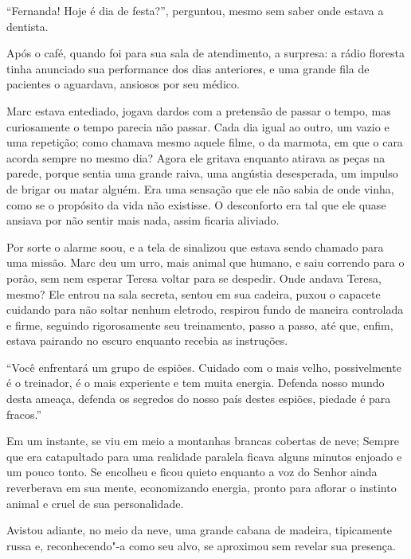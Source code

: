 ``Fernanda! Hoje é dia de festa?'', perguntou, mesmo sem saber onde
estava a dentista.

Após o café, quando foi para sua sala de atendimento, a surpresa: a
rádio floresta tinha anunciado sua performance dos dias anteriores, e uma
grande fila de pacientes o aguardava, ansiosos por seu médico.

\asterisc


Marc estava entediado, jogava dardos com a pretensão de passar o tempo,
mas curiosamente o tempo parecia não passar. Cada dia igual ao outro, um
vazio e uma repetição; como chamava mesmo aquele filme, o da marmota, em
que o cara acorda sempre no mesmo dia? Agora ele gritava enquanto
atirava as peças na parede, porque sentia uma grande raiva, uma angústia
desesperada, um impulso de brigar ou matar alguém. Era uma sensação que ele não
sabia de onde vinha, como se o propósito da vida não existisse. O
desconforto era tal que ele quase ansiava por não sentir mais nada, assim
ficaria aliviado.

Por sorte o alarme soou, e a tela de  sinalizou que estava sendo
chamado para uma missão. Marc deu um urro, mais animal que
humano, e saiu correndo para o porão, sem nem esperar Teresa voltar para
se despedir. Onde andava Teresa, mesmo? Ele entrou na sala secreta,
sentou em sua cadeira, puxou o capacete cuidando para não soltar nenhum
eletrodo, respirou fundo de maneira controlada e firme, seguindo
rigorosamente seu treinamento, passo a passo, até que, enfim, estava
pairando no escuro enquanto recebia as instruções.

``Você enfrentará um grupo de espiões. Cuidado com o mais velho,
possivelmente é o treinador, é o mais experiente e tem muita energia.
Defenda nosso mundo desta ameaça, defenda os segredos do nosso país
destes espiões, piedade é para fracos.''

Em um instante, se viu em meio a montanhas brancas cobertas de neve;
Sempre que era catapultado para uma realidade paralela ficava alguns
minutos enjoado e um pouco tonto. Se encolheu e ficou quieto enquanto a
voz do Senhor  ainda reverberava em sua mente, economizando energia,
pronto para aflorar o instinto animal e cruel de sua personalidade.

Avistou adiante, no meio da neve, uma grande cabana de madeira,
tipicamente russa e, reconhecendo"-a como seu alvo, se aproximou sem
revelar sua presença.

